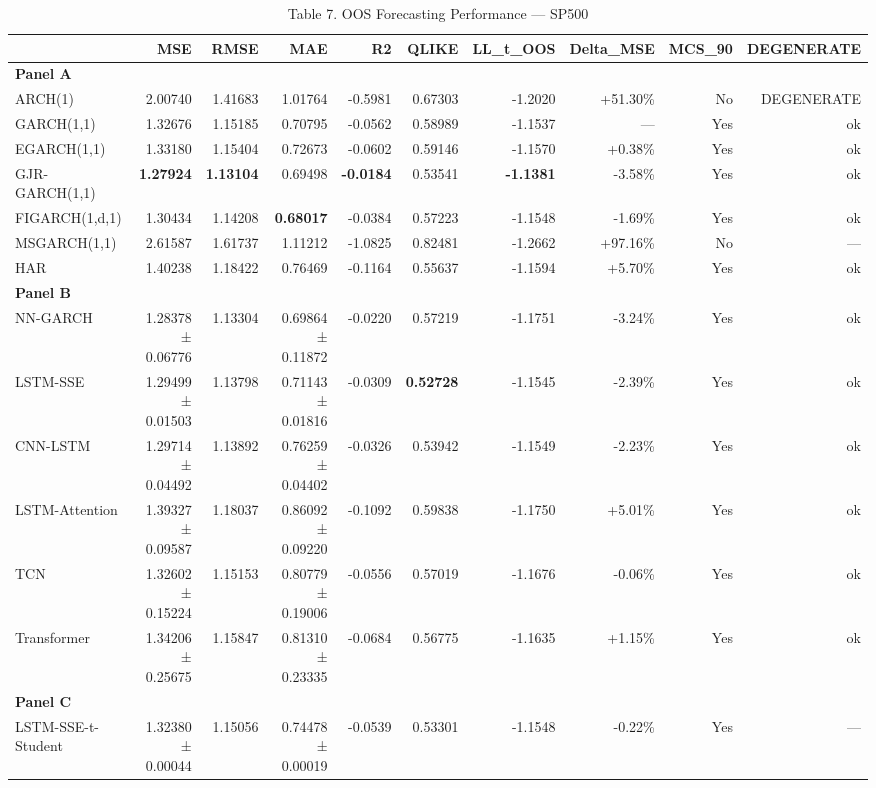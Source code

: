 \begin{table}[ht]
\centering
\caption{Table 7. OOS Forecasting Performance — SP500}
\label{tab:oos_sp500}
\begin{tabular}{lrrrrrrrrr}
\toprule
 & MSE & RMSE & MAE & R2 & QLIKE & LL_t_OOS & Delta_MSE & MCS_90 & DEGENERATE \\
\midrule
\multicolumn{10}{l}{\textbf{Panel A}} \\
ARCH(1) & 2.00740 & 1.41683 & 1.01764 & -0.5981 & 0.67303 & -1.2020 & +51.30\% & No & DEGENERATE \\
GARCH(1,1) & 1.32676 & 1.15185 & 0.70795 & -0.0562 & 0.58989 & -1.1537 & — & Yes & ok \\
EGARCH(1,1) & 1.33180 & 1.15404 & 0.72673 & -0.0602 & 0.59146 & -1.1570 & +0.38\% & Yes & ok \\
GJR-GARCH(1,1) & \textbf{1.27924} & \textbf{1.13104} & 0.69498 & \textbf{-0.0184} & 0.53541 & \textbf{-1.1381} & -3.58\% & Yes & ok \\
FIGARCH(1,d,1) & 1.30434 & 1.14208 & \textbf{0.68017} & -0.0384 & 0.57223 & -1.1548 & -1.69\% & Yes & ok \\
MSGARCH(1,1) & 2.61587 & 1.61737 & 1.11212 & -1.0825 & 0.82481 & -1.2662 & +97.16\% & No & — \\
HAR & 1.40238 & 1.18422 & 0.76469 & -0.1164 & 0.55637 & -1.1594 & +5.70\% & Yes & ok \\
\multicolumn{10}{l}{\textbf{Panel B}} \\
NN-GARCH & 1.28378 ± 0.06776 & 1.13304 & 0.69864 ± 0.11872 & -0.0220 & 0.57219 & -1.1751 & -3.24\% & Yes & ok \\
LSTM-SSE & 1.29499 ± 0.01503 & 1.13798 & 0.71143 ± 0.01816 & -0.0309 & \textbf{0.52728} & -1.1545 & -2.39\% & Yes & ok \\
CNN-LSTM & 1.29714 ± 0.04492 & 1.13892 & 0.76259 ± 0.04402 & -0.0326 & 0.53942 & -1.1549 & -2.23\% & Yes & ok \\
LSTM-Attention & 1.39327 ± 0.09587 & 1.18037 & 0.86092 ± 0.09220 & -0.1092 & 0.59838 & -1.1750 & +5.01\% & Yes & ok \\
TCN & 1.32602 ± 0.15224 & 1.15153 & 0.80779 ± 0.19006 & -0.0556 & 0.57019 & -1.1676 & -0.06\% & Yes & ok \\
Transformer & 1.34206 ± 0.25675 & 1.15847 & 0.81310 ± 0.23335 & -0.0684 & 0.56775 & -1.1635 & +1.15\% & Yes & ok \\
\multicolumn{10}{l}{\textbf{Panel C}} \\
LSTM-SSE-t-Student & 1.32380 ± 0.00044 & 1.15056 & 0.74478 ± 0.00019 & -0.0539 & 0.53301 & -1.1548 & -0.22\% & Yes & — \\

\end{tabular}
\end{table}

